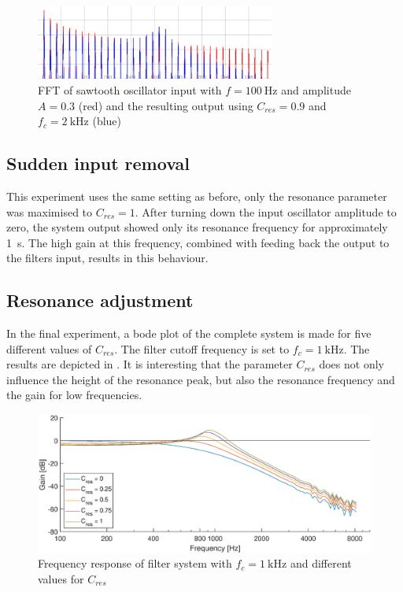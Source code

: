 \documentclass[a4paper, 12pt]{article}
\begin{document}
\begin{figure}[h!]
	\centering
	\includegraphics[width=0.7\textwidth]{fft-sawtooth-resonance.jpg}
	\caption{FFT of sawtooth oscillator input with $f=\SI{100}{\hertz}$ and amplitude $A=0.3$ (red) and the resulting output using $C_{res}=0.9$ and $f_c = \SI{2}{\kilo\hertz}$ (blue)}
	\label{fig:fft-sawtooth-resonance}
\end{figure}

\subsection{Sudden input removal}
This experiment uses the same setting as before, only the resonance parameter was maximised to $C_{res}=1$. After turning down the input oscillator amplitude to zero, the system output showed only its resonance frequency for approximately \SI{1}{\second}. The high gain at this frequency, combined with feeding back the output to the filters input, results in this behaviour.

\subsection{Resonance adjustment} \label{subsec:c-adjust}
In the final experiment, a bode plot of the complete system is made for five different values of $C_{res}$. The filter cutoff frequency is set to $f_c = \SI{1}{\kilo\hertz}$. The results are depicted in . It is interesting that the parameter $C_{res}$ does not only influence the height of the resonance peak, but also the resonance frequency and the gain for low frequencies.

\begin{figure}[h!]
	\centering
	\includegraphics[width=\textwidth]{resonances.eps}
	\caption{Frequency response of filter system with $f_c = \SI{1}{\kilo\hertz}$ and different values for $C_{res}$}
	\label{fig:c-adjust}
\end{figure}

\sloppy
\printbibliography
\end{document}
